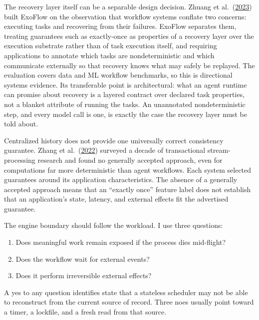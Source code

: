 The recovery layer itself can be a separable design decision. Zhuang et al.~(\href{https://www.usenix.org/conference/osdi23/presentation/zhuang}{2023}) built ExoFlow on the observation that workflow systems conflate two concerns: executing tasks and recovering from their failures. ExoFlow separates them, treating guarantees such as exactly-once as properties of a recovery layer over the execution substrate rather than of task execution itself, and requiring applications to annotate which tasks are nondeterministic and which communicate externally so that recovery knows what may safely be replayed. The evaluation covers data and ML workflow benchmarks, so this is directional systems evidence. Its transferable point is architectural: what an agent runtime can promise about recovery is a layered contract over declared task properties, not a blanket attribute of running the tasks. An unannotated nondeterministic step, and every model call is one, is exactly the case the recovery layer must be told about.

Centralized history does not provide one universally correct consistency guarantee. Zhang et al.~(\href{https://arxiv.org/abs/2208.09827}{2022}) surveyed a decade of transactional stream-processing research and found no generally accepted approach, even for computations far more deterministic than agent workflows. Each system selected guarantees around its application characteristics. The absence of a generally accepted approach means that an ``exactly once'' feature label does not establish that an application's state, latency, and external effects fit the advertised guarantee.


The engine boundary should follow the workload. I use three questions:

\begin{enumerate}
\def\labelenumi{\arabic{enumi}.}
\tightlist
\item
  Does meaningful work remain exposed if the process dies mid-flight?
\item
  Does the workflow wait for external events?
\item
  Does it perform irreversible external effects?
\end{enumerate}

A yes to any question identifies state that a stateless scheduler may not be able to reconstruct from the current source of record. Three noes usually point toward a timer, a lockfile, and a fresh read from that source.


